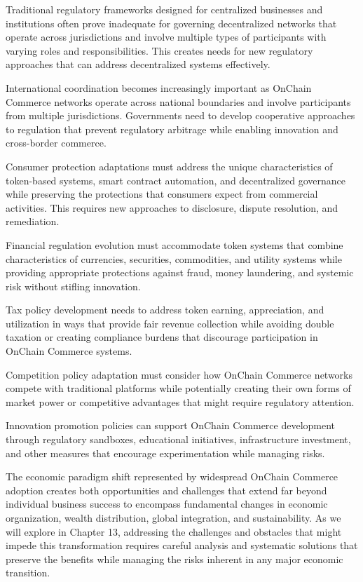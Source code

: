 \documentclass[
  Letterpaper,
]{scrbook}
\begin{document}
Traditional regulatory frameworks designed for centralized businesses
and institutions often prove inadequate for governing decentralized
networks that operate across jurisdictions and involve multiple types of
participants with varying roles and responsibilities. This creates needs
for new regulatory approaches that can address decentralized systems
effectively.

International coordination becomes increasingly important as OnChain
Commerce networks operate across national boundaries and involve
participants from multiple jurisdictions. Governments need to develop
cooperative approaches to regulation that prevent regulatory arbitrage
while enabling innovation and cross-border commerce.

Consumer protection adaptations must address the unique characteristics
of token-based systems, smart contract automation, and decentralized
governance while preserving the protections that consumers expect from
commercial activities. This requires new approaches to disclosure,
dispute resolution, and remediation.

Financial regulation evolution must accommodate token systems that
combine characteristics of currencies, securities, commodities, and
utility systems while providing appropriate protections against fraud,
money laundering, and systemic risk without stifling innovation.

Tax policy development needs to address token earning, appreciation, and
utilization in ways that provide fair revenue collection while avoiding
double taxation or creating compliance burdens that discourage
participation in OnChain Commerce systems.

Competition policy adaptation must consider how OnChain Commerce
networks compete with traditional platforms while potentially creating
their own forms of market power or competitive advantages that might
require regulatory attention.

Innovation promotion policies can support OnChain Commerce development
through regulatory sandboxes, educational initiatives, infrastructure
investment, and other measures that encourage experimentation while
managing risks.

The economic paradigm shift represented by widespread OnChain Commerce
adoption creates both opportunities and challenges that extend far
beyond individual business success to encompass fundamental changes in
economic organization, wealth distribution, global integration, and
sustainability. As we will explore in Chapter 13, addressing the
challenges and obstacles that might impede this transformation requires
careful analysis and systematic solutions that preserve the benefits
while managing the risks inherent in any major economic transition.
\end{document}
